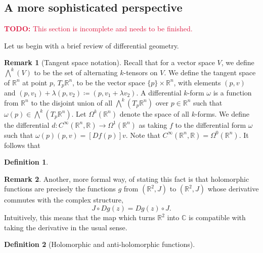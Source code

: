 \documentclass[aps,pra,showpacs,notitlepage,onecolumn,superscriptaddress,nofootinbib]{revtex4-1}
\newcommand{\pop}[1]{\textcolor{crimson}{#1}}
\newcommand{\Wedge}{\bigwedge}
\theoremstyle{definition}
\newtheorem{definition}{Definition}[section]
\newtheorem{remark}{Remark}[section]
\newcommand{\hhrulefill}{\hspace{-1.5em} \hrulefill}
\begin{document}
\hhrulefill

\subsection{A more sophisticated perspective}

\noindent \pop{\textbf{TODO:} This section is incomplete and needs to be finished.}
\newline

\noindent Let us begin with a brief review of differential geometry.

\begin{remark}[Tangent space notation]
Recall that for a vector space $V$, we define $\Wedge^{k}(V)$ to be the set of alternating $k$-tensors on $V$.
We define the tangent space of $\mathbb{R}^{n}$ at point $p$, $T_p \mathbb{R}^n$, to be the vector space $\{p\} \times \mathbb{R}^{n}$, with elements $(p, v)$ and $(p, v_1) + \lambda (p, v_2) \coloneqq (p, v_1 + \lambda v_2)$.
A differential $k$-form $\omega$ is a function from $\mathbb{R}^{n}$ to the disjoint union of all $\Wedge^{k}(T_p \mathbb{R}^{n})$ over $p \in \mathbb{R}^{n}$ such that $\omega(p) \in \Wedge^{k}(T_p \mathbb{R}^{n})$. Let $\Omega^{k}(\mathbb{R}^{n})$
denote the space of all $k$-forms. We define the differential $d : C^{\infty}(\mathbb{R}^{n}, \mathbb{R}) \rightarrow \Omega^1(\mathbb{R}^n)$ as taking $f$ to the differential form $\omega$ such that $\omega(p)(p, v) = [D f(p)] v$. Note that
$C^{\infty}(\mathbb{R}^{n}, \mathbb{R}) = \Omega^0(\mathbb{R}^n)$. It follows that
\end{remark}

\begin{definition}
  \end{definition}

\begin{remark}
  Another, more formal way, of stating this fact is that holomorphic functions are precisely the functions $g$ from $(\mathbb{R}^2, J)$ to $(\mathbb{R}^2, J)$ whose derivative
  commutes with the complex structure,
  \begin{equation}
    J \circ D g(z) = D g(z) \circ J.
  \end{equation}
  Intuitively, this means that the map which turns $\mathbb{R}^2$ into $\mathbb{C}$ is compatible with taking the derivative in the usual sense.
  \end{remark}

\begin{definition}[Holomorphic and anti-holomorphic functions]
\end{definition}
\end{document}
